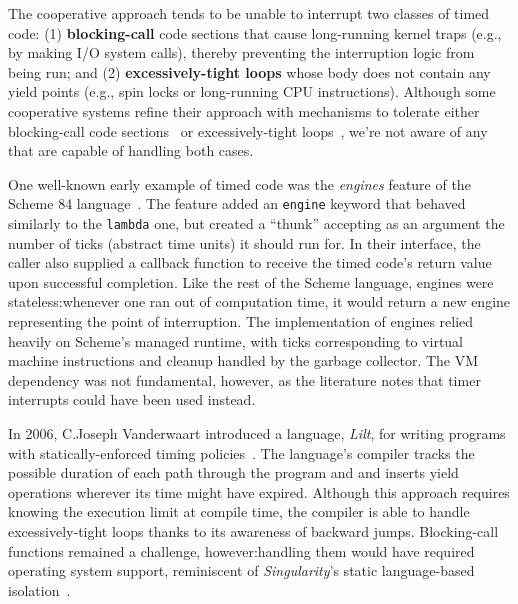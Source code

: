 
The cooperative approach tends to be unable to interrupt two classes of timed code:\@
(1) \textbf{blocking-call} code sections that cause
long-running kernel traps (e.g., by making I/O system calls),
thereby preventing the interruption logic from being run; and (2)
\textbf{excessively-tight loops} whose body does not contain any yield points (e.g.,
spin locks or long-running CPU instructions).
Although some cooperative systems refine their approach with mechanisms
to tolerate either blocking-call code sections~\cite{www-golang} or excessively-tight
loops~\cite{vanderwaart:cmucs2006}, we're not aware of any that are capable of
handling both
cases.

One well-known early example of timed code was the \textit{engines} feature of
the Scheme 84 language~\cite{haynes:iucs1984}.  The feature added an \texttt{engine}
keyword that behaved similarly to the \texttt{lambda} one, but created a ``thunk''
accepting as an argument the number of ticks (abstract time units) it should run for.
In their interface, the caller also supplied a callback function to receive the
timed code's return value upon successful completion.  Like the rest of the
Scheme language, engines were stateless:\@ whenever one ran out of computation time,
it would return a new engine representing the point of interruption.  The
implementation of engines relied heavily on Scheme's managed runtime, with ticks
corresponding to virtual machine instructions and cleanup handled by the garbage
collector.  The VM dependency was not fundamental, however, as the literature notes
that timer interrupts could have been used instead.


In 2006, C.\@ Joseph Vanderwaart introduced a language, \textit{Lilt}, for writing
programs with statically-enforced timing policies~\cite{vanderwaart:cmucs2006}.  The
language's compiler tracks the possible duration of each path through the program and
and inserts yield operations wherever its time might have expired.  Although this
approach requires knowing the execution limit at compile time, the compiler is able
to handle excessively-tight loops thanks to its awareness of backward jumps.
Blocking-call functions remained a challenge, however:\@ handling them would have
required
operating system support, reminiscent of \textit{Singularity}'s static language-based
isolation~\cite{hunt:msr2005}.

